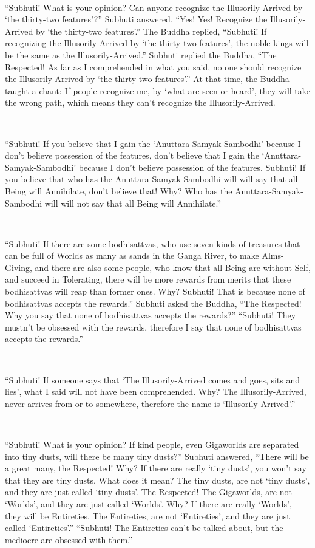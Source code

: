 \documentclass[a5paper,12pt]{book}
\begin{document}
    ~

     ``Subhuti! What is your opinion? Can anyone recognize the Illusorily-Arrived by `the thirty-two features'?'' Subhuti answered, ``Yes! Yes! Recognize the Illusorily-Arrived by `the thirty-two features'.'' The Buddha replied, ``Subhuti! If recognizing the Illusorily-Arrived by `the thirty-two features', the noble kings will be the same as the Illusorily-Arrived.'' Subhuti replied the Buddha, ``The Respected! As far as I comprehended in what you said, no one should recognize the Illusorily-Arrived by `the thirty-two features'.'' At that time, the Buddha taught a chant: If people recognize me, by `what are seen or heard', they will take the wrong path, which means they can't recognize the Illusorily-Arrived.

    ~

     ``Subhuti! If you believe that I gain the `Anuttara-Samyak-Sambodhi' because I don't believe possession of the features, don't believe that I gain the `Anuttara-Samyak-Sambodhi' because I don't believe possession of the features. Subhuti! If you believe that who has the Anuttara-Samyak-Sambodhi will will say that all Being will Annihilate, don't believe that! Why? Who has the Anuttara-Samyak-Sambodhi will will not say that all Being will Annihilate.''

    ~

     ``Subhuti! If there are some bodhisattvas, who use seven kinds of treasures that can be full of Worlds as many as sands in the Ganga River, to make Alms-Giving, and there are also some people, who know that all Being are without Self, and succeed in Tolerating, there will be more rewards from merits that these bodhisattvas will reap than former ones. Why? Subhuti! That is because none of bodhisattvas accepts the rewards.'' Subhuti asked the Buddha, ``The Respected! Why you say that none of bodhisattvas accepts the rewards?'' ``Subhuti! They mustn't be obsessed with the rewards, therefore I say that none of bodhisattvas accepts the rewards.''

    ~

     ``Subhuti! If someone says that `The Illusorily-Arrived comes and goes, sits and lies', what I said will not have been comprehended. Why? The Illusorily-Arrived, never arrives from or to somewhere, therefore the name is `Illusorily-Arrived'.''

    ~

     ``Subhuti! What is your opinion? If kind people, even Gigaworlds are separated into tiny dusts, will there be many tiny dusts?'' Subhuti answered, ``There will be a great many, the Respected! Why? If there are really `tiny dusts', you won't say that they are tiny dusts. What does it mean? The tiny dusts, are not `tiny dusts', and they are just called `tiny dusts'. The Respected! The Gigaworlds, are not `Worlds', and they are just called `Worlds'. Why? If there are really `Worlds', they will be Entireties. The Entireties, are not `Entireties', and they are just called `Entireties'.'' ``Subhuti! The Entireties can't be talked about, but the mediocre are obsessed with them.''
\end{document}
